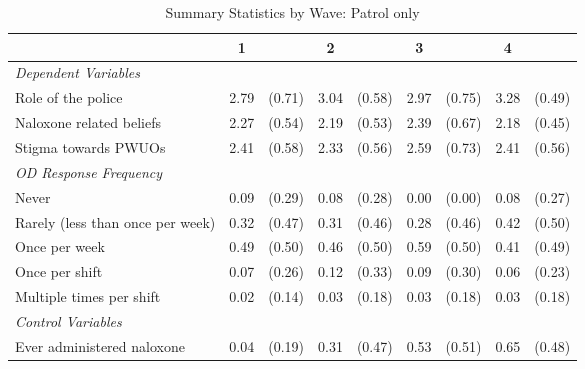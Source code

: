 \begin{table}[htbp]\centering
\def\sym#1{\ifmmode^{#1}\else\(^{#1}\)\fi}
\caption{\centering Summary Statistics by Wave: Patrol only}
\begin{tabular}{l*{4}{cc}}
\hline\hline
                &        1&         &        2&         &        3&         &        4&         \\
\hline
\emph{Dependent Variables}&         &         &         &         &         &         &         &         \\
\hspace{0.25cm} Role of the police&     2.79&   (0.71)&     3.04&   (0.58)&     2.97&   (0.75)&     3.28&   (0.49)\\
\hspace{0.25cm} Naloxone related beliefs&     2.27&   (0.54)&     2.19&   (0.53)&     2.39&   (0.67)&     2.18&   (0.45)\\
\hspace{0.25cm} Stigma towards PWUOs&     2.41&   (0.58)&     2.33&   (0.56)&     2.59&   (0.73)&     2.41&   (0.56)\\
\emph{OD Response Frequency}&         &         &         &         &         &         &         &         \\
\hspace{0.25cm} Never&     0.09&   (0.29)&     0.08&   (0.28)&     0.00&   (0.00)&     0.08&   (0.27)\\
\hspace{0.25cm} Rarely (less than once per week)&     0.32&   (0.47)&     0.31&   (0.46)&     0.28&   (0.46)&     0.42&   (0.50)\\
\hspace{0.25cm} Once per week&     0.49&   (0.50)&     0.46&   (0.50)&     0.59&   (0.50)&     0.41&   (0.49)\\
\hspace{0.25cm} Once per shift&     0.07&   (0.26)&     0.12&   (0.33)&     0.09&   (0.30)&     0.06&   (0.23)\\
\hspace{0.25cm} Multiple times per shift&     0.02&   (0.14)&     0.03&   (0.18)&     0.03&   (0.18)&     0.03&   (0.18)\\
\vspace{0.1em} \emph{Control Variables}&         &         &         &         &         &         &         &         \\
\hspace{0.25cm} Ever administered naloxone&     0.04&   (0.19)&     0.31&   (0.47)&     0.53&   (0.51)&     0.65&   (0.48)\\

\end{tabular}
\end{table}
